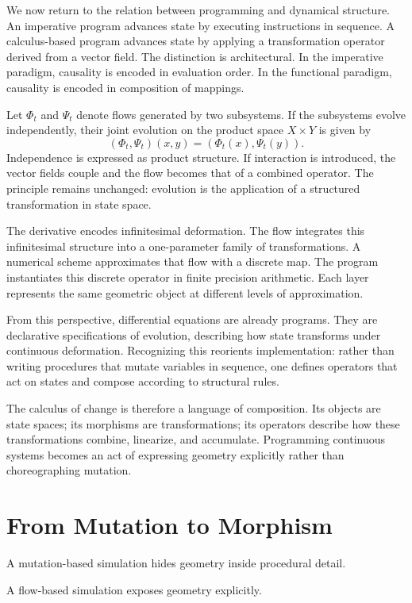 \documentclass[12pt]{book}
\begin{document}
We now return to the relation between programming and dynamical
structure. An imperative program advances state by executing
instructions in sequence. A calculus-based program advances state by
applying a transformation operator derived from a vector field. The
distinction is architectural. In the imperative paradigm, causality is
encoded in evaluation order. In the functional paradigm, causality is
encoded in composition of mappings.

Let $\Phi_t$ and $\Psi_t$ denote flows generated by two subsystems.
If the subsystems evolve independently, their joint evolution on the
product space $X \times Y$ is given by
\[
(\Phi_t, \Psi_t)(x,y) = (\Phi_t(x), \Psi_t(y)).
\]
Independence is expressed as product structure. If interaction is
introduced, the vector fields couple and the flow becomes that of a
combined operator. The principle remains unchanged: evolution is the
application of a structured transformation in state space.

The derivative encodes infinitesimal deformation. The flow integrates
this infinitesimal structure into a one-parameter family of
transformations. A numerical scheme approximates that flow with a
discrete map. The program instantiates this discrete operator in
finite precision arithmetic. Each layer represents the same geometric
object at different levels of approximation.

From this perspective, differential equations are already programs.
They are declarative specifications of evolution, describing how
state transforms under continuous deformation. Recognizing this
reorients implementation: rather than writing procedures that mutate
variables in sequence, one defines operators that act on states and
compose according to structural rules.

The calculus of change is therefore a language of composition. Its
objects are state spaces; its morphisms are transformations; its
operators describe how these transformations combine, linearize, and
accumulate. Programming continuous systems becomes an act of
expressing geometry explicitly rather than choreographing mutation.

\section{From Mutation to Morphism}

A mutation-based simulation hides geometry inside procedural detail.

A flow-based simulation exposes geometry explicitly.
\end{document}

